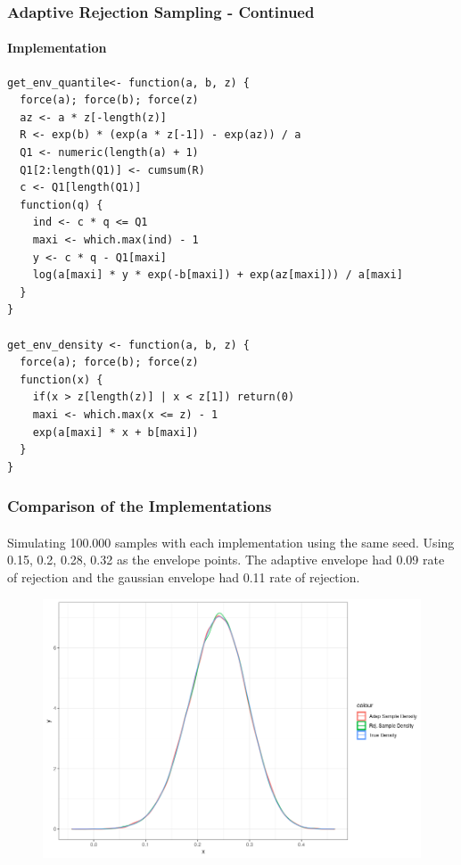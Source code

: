 \documentclass[aspectratio=169]{beamer}
\begin{document}
\begin{frame}[fragile]
  \frametitle{Adaptive Rejection Sampling - Continued}
  \framesubtitle{Implementation}
\begin{verbatim}
get_env_quantile<- function(a, b, z) {
  force(a); force(b); force(z)
  az <- a * z[-length(z)]
  R <- exp(b) * (exp(a * z[-1]) - exp(az)) / a
  Q1 <- numeric(length(a) + 1)
  Q1[2:length(Q1)] <- cumsum(R)
  c <- Q1[length(Q1)]
  function(q) {
    ind <- c * q <= Q1
    maxi <- which.max(ind) - 1
    y <- c * q - Q1[maxi]
    log(a[maxi] * y * exp(-b[maxi]) + exp(az[maxi])) / a[maxi]
  }
}

get_env_density <- function(a, b, z) {
  force(a); force(b); force(z)
  function(x) {
    if(x > z[length(z)] | x < z[1]) return(0)
    maxi <- which.max(x <= z) - 1
    exp(a[maxi] * x + b[maxi])
  }
}
\end{verbatim}
\end{frame}
\begin{frame}
  \frametitle{Comparison of the Implementations}
  \framesubtitle{}
  Simulating 100.000 samples with each implementation using the same seed. Using 0.15, 0.2, 0.28, 0.32 as the envelope points. The adaptive envelope had 0.09 rate of rejection and the gaussian envelope had 0.11 rate of rejection.
  \begin{figure}
  \centering
  \includegraphics[scale = 0.36]{figure/AdapVsRejDensity.png}
  \end{figure}
\end{frame}
\end{document}
